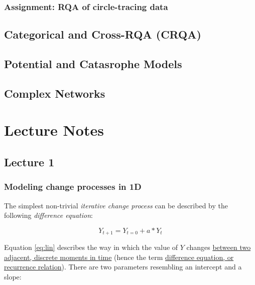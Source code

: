 \documentclass[]{book}
\let\stdsection\section
\renewcommand\section{\newpage\stdsection}
\begin{document}
\section{Assignment: RQA of circle-tracing
data}\label{assignment-rqa-of-circle-tracing-data}

\chapter{\texorpdfstring{\textbf{Categorical and Cross-RQA
(CRQA)}}{Categorical and Cross-RQA (CRQA)}}\label{CRQA}

\chapter{Potential and Catasrophe Models}\label{cusp}

\chapter{Complex Networks}\label{nets}

\part{Lecture Notes}\label{part-lecture-notes}

\chapter*{Lecture 1}\label{lecture-1}

\section*{Modeling change processes in
1D}\label{modeling-change-processes-in-1d}

The simplest non-trivial \emph{iterative change process} can be
described by the following \emph{difference equation}:

\begin{equation}
Y_{t+1} = Y_{t=0} + a*Y_t
\label{eq:lin}
\end{equation}

Equation \eqref{eq:lin} describes the way in which the value of \(Y\)
changes
\href{https://en.wikipedia.org/wiki/Discrete_time_and_continuous_time}{between
two adjacent, discrete moments in time} (hence the term
\href{https://en.wikipedia.org/wiki/Recurrence_relation}{difference
equation, or recurrence relation}). There are two parameters resembling
an intercept and a slope:
\end{document}

